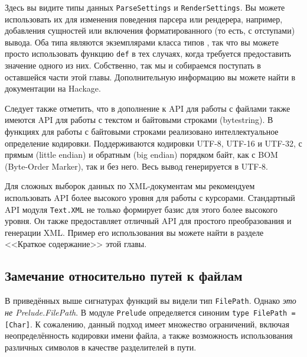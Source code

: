 Здесь вы видите типы данных \lstinline!ParseSettings! и
\lstinline!RenderSettings!. Вы можете использовать их для изменения поведения
парсера или рендерера, например, добавления сущностей или включения
форматированного (то есть, с отступами) вывода. Оба типа являются экземплярами
класса типов
,
так что вы можете просто использовать функцию \lstinline!def! в тех случаях,
когда требуется предоставить значение одного из них. Собственно, так мы и
собираемся поступать в оставшейся части этой главы. Дополнительную информацию
вы можете найти в документации на Hackage.

Следует также отметить, что в дополнение к API для работы с файлами также
имеются API для работы с текстом и байтовыми строками (bytestring). В функциях
для работы с байтовыми строками реализовано интеллектуальное определение
кодировки. Поддерживаются кодировки UTF-8, UTF-16 и UTF-32, с прямым (little
endian) и обратным (big endian) порядком байт, как с BOM (Byte-Order Marker),
так и без него. Весь вывод генерируется в UTF-8.

Для сложных выборок данных по XML-документам мы рекомендуем использовать API
более высокого уровня для работы с курсорами. Стандартный API модуля
\lstinline!Text.XML! не только формирует базис для этого более высокого уровня.
Он также предоставляет отличный API для простого преобразования и генерации
XML. Пример его использования вы можете найти в разделе <<Краткое содержание>>
этой главы.

\subsection{Замечание относительно путей к файлам}
В приведённых выше сигнатурах функций вы видели тип \lstinline!FilePath!.
Однако \emph{это не Prelude.FilePath}. В модуле \lstinline!Prelude!
определяется синоним \lstinline!type FilePath = [Char]!. К сожалению, данный
подход имеет множество ограничений, включая неопределённость кодировки имени
файла, а также возможность использования различных символов в качестве
разделителей в пути.

